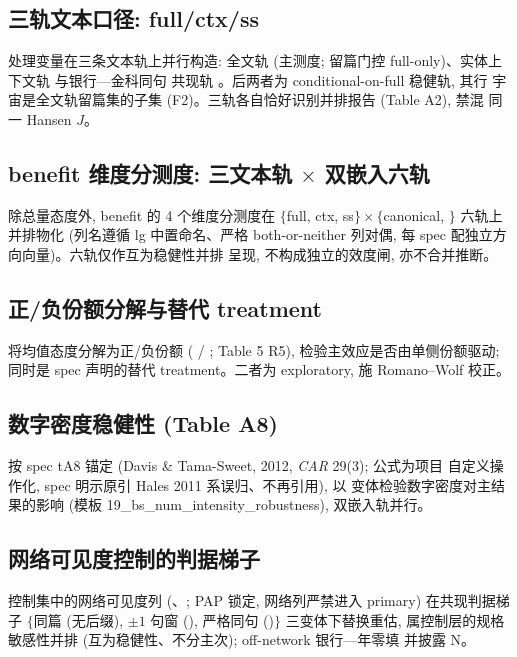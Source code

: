 \subsection{三轨文本口径: full/ctx/ss}\label{sec:robust:tracks}
处理变量在三条文本轨上并行构造: 全文轨  (主测度;
留篇门控 full-only)、实体上下文轨  与银行—金科同句
共现轨 。后两者为 conditional-on-full 稳健轨, 其行
宇宙是全文轨留篇集的子集 (F2)。三轨各自恰好识别并排报告 (Table A2), 禁混
同一 Hansen $J$。

\subsection{benefit 维度分测度: 三文本轨 $\times$ 双嵌入六轨}\label{sec:robust:dims}
除总量态度外, benefit 的 4 个维度分测度在 $\{$full, ctx, ss$\} \times
\{$canonical, $\}$ 六轨上并排物化 (列名遵循 lg 中置命名、严格
both-or-neither 列对偶, 每 spec 配独立方向向量)。六轨仅作互为稳健性并排
呈现, 不构成独立的效度闸, 亦不合并推断。

\subsection{正/负份额分解与替代 treatment}\label{sec:robust:decomp}
将均值态度分解为正/负份额 ( /
; Table 5 R5), 检验主效应是否由单侧份额驱动;
 同时是 spec 声明的替代 treatment。二者为
exploratory, 施 Romano--Wolf 校正。

\subsection{数字密度稳健性 (Table A8)}\label{sec:robust:numint}
按 spec tA8 锚定 (Davis \& Tama-Sweet, 2012, \emph{CAR} 29(3); 公式为项目
自定义操作化, spec 明示原引 Hales 2011 系误归、不再引用), 以
 变体检验数字密度对主结果的影响 (模板
19\_bs\_num\_intensity\_robustness), 双嵌入轨并行。

\subsection{网络可见度控制的判据梯子}\label{sec:robust:netcrit}
控制集中的网络可见度列 (、;
PAP 锁定, 网络列严禁进入 primary) 在共现判据梯子 $\{$同篇 (无后缀),
$\pm 1$ 句窗 (), 严格同句 ()$\}$ 三变体下替换重估,
属控制层的规格敏感性并排 (互为稳健性、不分主次); off-network 银行—年零填
并披露 N。

